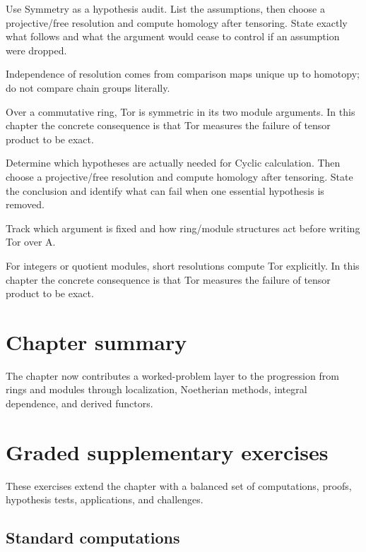 \begin{exercise}\label{exr:v26-07}
Use Symmetry as a hypothesis audit. List the assumptions, then choose a projective/free resolution and compute homology after tensoring. State exactly what follows and what the argument would cease to control if an assumption were dropped.
\end{exercise}
\begin{hint}
Independence of resolution comes from comparison maps unique up to homotopy; do not compare chain groups literally.
\end{hint}
\begin{solution}
Over a commutative ring, Tor is symmetric in its two module arguments. In this chapter the concrete consequence is that Tor measures the failure of tensor product to be exact.
\end{solution}

\begin{exercise}\label{exr:v26-08}
Determine which hypotheses are actually needed for Cyclic calculation. Then choose a projective/free resolution and compute homology after tensoring. State the conclusion and identify what can fail when one essential hypothesis is removed.
\end{exercise}
\begin{hint}
Track which argument is fixed and how ring/module structures act before writing Tor over A.
\end{hint}
\begin{solution}
For integers or quotient modules, short resolutions compute Tor explicitly. In this chapter the concrete consequence is that Tor measures the failure of tensor product to be exact.
\end{solution}

\section*{Chapter summary}
The chapter now contributes a worked-problem layer to the progression from rings and modules through localization, Noetherian methods, integral dependence, and derived functors.
\section{Graded supplementary exercises}
These exercises extend the chapter with a balanced set of computations, proofs, hypothesis tests, applications, and challenges.

\subsection*{Standard computations}

